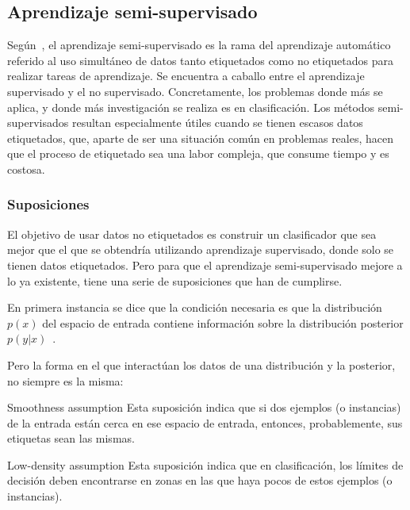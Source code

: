 \subsection{Aprendizaje semi-supervisado}
\label{aprendizaje-semi-supervisado}

Según~\cite{vanEngelen2020}, el aprendizaje semi-supervisado es la rama del
aprendizaje automático referido al uso simultáneo de datos tanto etiquetados
como no etiquetados para realizar tareas de aprendizaje. Se encuentra a caballo
entre el aprendizaje supervisado y el no supervisado. Concretamente, los
problemas donde más se aplica, y donde más investigación se realiza es en
clasificación. Los métodos semi-supervisados resultan especialmente útiles
cuando se tienen escasos datos etiquetados, que, aparte de ser una situación
común en problemas reales, hacen que el proceso de etiquetado sea una labor
compleja, que consume tiempo y es costosa.

\subsubsection{Suposiciones}
El objetivo de usar datos no etiquetados es construir un clasificador que sea
mejor que el que se obtendría utilizando aprendizaje supervisado, donde solo se
tienen datos etiquetados. Pero para que el aprendizaje semi-supervisado mejore a
lo ya existente, tiene una serie de suposiciones que han de cumplirse.

En primera instancia se dice que la condición necesaria es que la distribución
$p(x)$ del espacio de entrada contiene información sobre la distribución
posterior $p(y|x)$~\cite{vanEngelen2020}.

Pero la forma en el que interactúan los datos de una distribución y la posterior,
no siempre es la misma:

\begin{mainbox}{Smoothness assumption}
    Esta suposición indica que si dos ejemplos (o instancias) de la entrada
    están cerca en ese espacio de entrada, entonces, probablemente, sus
    etiquetas sean las mismas.
\end{mainbox}

\medskip

\begin{mainbox}{Low-density assumption}
    Esta suposición indica que en clasificación, los límites de decisión deben
    encontrarse en zonas en las que haya pocos de estos ejemplos (o instancias).
\end{mainbox}


